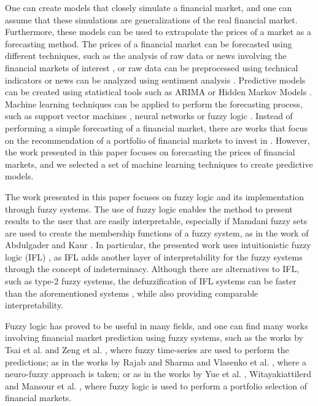 \documentclass{ieeeaccess}
\begin{document}
One can create models that closely simulate a financial market, and
one can assume that these simulations are generalizations of the real
financial market. Furthermore, these models can
be used to extrapolate the prices of a market as a forecasting
method. The prices of a financial market can be forecasted using
different techniques, such as the analysis of raw data or news
involving the financial markets of interest \cite{Liu2019}, or raw
data can be preprocessed using technical indicators
\cite{Alsubaie2019} or news can be analyzed using sentiment analysis
\cite{LienMinh2018} \cite{Cabrera2018}. Predictive models can be
created using statistical tools such as ARIMA \cite{Idrees2019} or
Hidden Markov Models \cite{Cao2019}. Machine learning techniques can
be applied to perform the forecasting process, such as support vector
machines \cite{Guo2018}, neural networks \cite{Chen2019a} or fuzzy
logic \cite{Jiang2018}. Instead of performing a simple forecasting of
a financial market, there are works that focus on the recommendation
of a portfolio of financial markets to invest in
\cite{Chen2019b}. However, the work presented in this paper focuses on
forecasting the prices of financial markets, and we selected a set of
machine learning techniques to create predictive models.

The work presented in this paper focuses on fuzzy logic and its
implementation through fuzzy systems. The use of fuzzy logic enables
the method to present results to the user that are easily
interpretable, especially if Mamdani fuzzy sets \cite{Mamdani1975} are
used to create the membership functions of a fuzzy system, as in the
work of Abdulgader and Kaur \cite{Abdulgader2019}. In particular, the
presented work uses intuitionistic fuzzy logic (IFL)
\cite{Atanassov1986} \cite{Atanassov2003}, as IFL adds another layer
of interpretability for the fuzzy systems through the concept of
indeterminacy. Although there are alternatives to IFL, such as type-2
fuzzy systems, the defuzzification of IFL systems can be faster than
the aforementioned systems \cite{Hernandez-Aguila2016}, while also
providing comparable interpretability.

Fuzzy logic has proved to be useful in many fields, and one can find
many works involving financial market prediction using fuzzy systems,
such as the works by Tsai et al. \cite{Tsai2019} and Zeng et
al. \cite{Zeng2019}, where fuzzy time-series are used to perform the
predictions; as in the works by Rajab and Sharma \cite{Rajab2019} and
Vlasenko et al. \cite{Vlasenko2019}, where a neuro-fuzzy approach is
taken; or as in the works by Yue et al. \cite{Yue2019},
Witayakiattilerd \cite{Witayakiattilerd2019} and Mansour et
al. \cite{Mansour2019}, where fuzzy logic is used to perform a
portfolio selection of financial markets.
\end{document}

